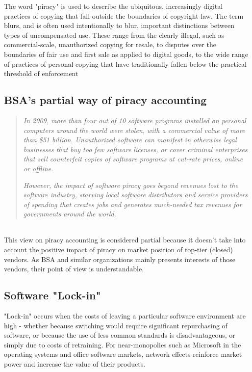 \documentclass[times, utf8, seminar]{fit}
\begin{document}
The word "piracy" is used to describe the ubiquitous, increasingly digital practices of copying that fall outside the boundaries of copyright law. The term blurs, and is often used intentionally to blur, important distinctions between types of uncompensated use. These range from the clearly illegal, such as commercial-scale, unauthorized copying for resale, to disputes over the boundaries of fair use and first sale as applied to digital goods, to the wide range of practices of personal copying that have traditionally fallen below the practical threshold of enforcement\citep{mediapiracy}

\subsection{BSA's partial way of piracy accounting}

\begin{quotation}
\emph{In 2009, more than four out of 10 software programs installed on personal computers around the world were stolen, with a commercial value of more than \$51 billion. Unauthorized software can manifest in otherwise legal businesses that buy too few software licenses, or cover criminal enterprises that sell counterfeit copies of software programs at cut-rate prices, online or offline.}

\emph{However, the impact of software piracy goes beyond revenues lost to the software industry, starving local software distributors and service providers of spending that creates jobs and generates much-needed tax revenues for governments around the world.}\citep{bsapiracyimpact}
\end{quotation}\\
This view on piracy accounting is considered partial because it doesn't take into account the positive impact of piracy on market position of top-tier (closed) vendors. As BSA and similar organizations mainly presents interests of those vendors, their point of view is understandable.  

\subsection{Software "Lock-in"}

"Lock-in" occurs when the costs of leaving a particular software environment are high - whether because switching would require significant repurchasing of software, or because the use of less common standards is disadvantageous, or simply due to costs of retraining. For near-monopolies such as Microsoft in the operating systems and office software markets, network effects reinforce market power and increase the value of their products.
\end{document}
